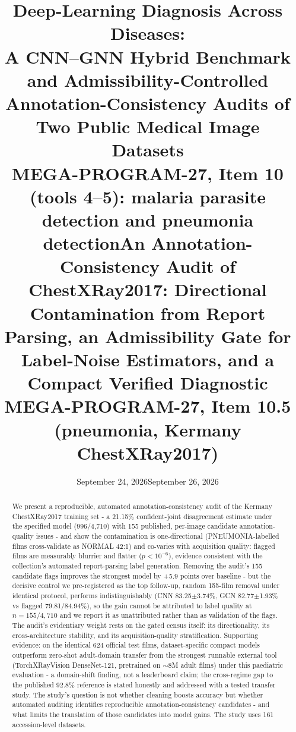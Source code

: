 \documentclass[11pt]{article}
\title{\textbf{Deep-Learning Diagnosis Across Diseases:\\
A CNN--GNN Hybrid Benchmark and Admissibility-Controlled\\Annotation-Consistency Audits of Two Public Medical Image Datasets}\\[6pt]
\large MEGA-PROGRAM-27, Item 10 (tools 4--5): malaria parasite detection and pneumonia detection}
\author{}
\date{September 24, 2026}
\title{\textbf{An Annotation-Consistency Audit of ChestXRay2017: Directional Contamination from Report Parsing, an Admissibility Gate for Label-Noise Estimators, and a Compact Verified Diagnostic}\\
\large MEGA-PROGRAM-27, Item 10.5 (pneumonia, Kermany ChestXRay2017)}
\author{}
\date{September 26, 2026}
\theoremstyle{definition}
\begin{document}
\maketitle
\begin{abstract}
We present a reproducible, automated annotation-consistency audit of the Kermany ChestXRay2017 training set - a 21.15\% confident-joint disagreement estimate under the specified model (996/4{,}710) with 155 published, per-image candidate annotation-quality issues - and show the contamination is one-directional (PNEUMONIA-labelled films cross-validate as NORMAL 42:1) and co-varies with acquisition quality: flagged films are measurably blurrier and flatter ($p<10^{-6}$), evidence consistent with the collection's automated report-parsing label generation. Removing the audit's 155 candidate flags improves the strongest model by +5.9 points over baseline - but the decisive control we pre-registered as the top follow-up, random 155-film removal under identical protocol, performs indistinguishably (CNN 83.25$\pm$3.74\%, GCN 82.77$\pm$1.93\% vs flagged 79.81/84.94\%), so the gain cannot be attributed to label quality at $n{=}155/4{,}710$ and we report it as unattributed rather than as validation of the flags. The audit's evidentiary weight rests on the gated census itself: its directionality, its cross-architecture stability, and its acquisition-quality stratification. Supporting evidence: on the identical 624 official test films, dataset-specific compact models outperform zero-shot adult-domain transfer from the strongest runnable external tool (TorchXRayVision DenseNet-121, pretrained on $\sim$8M adult films) under this paediatric evaluation - a domain-shift finding, not a leaderboard claim; the cross-regime gap to the published 92.8\% reference is stated honestly and addressed with a tested transfer study. The study's question is not whether cleaning boosts accuracy but whether automated auditing identifies reproducible annotation-consistency candidates - and what limits the translation of those candidates into model gains. The study uses 161 accession-level datasets.
\end{abstract}
\tableofcontents
\newpage




































\end{document}
